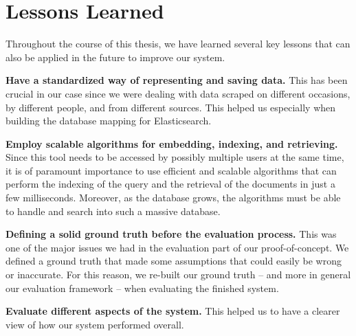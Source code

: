 \section{Lessons Learned}\label{sec:lessons-learned}
Throughout the course of this thesis, we have learned several key lessons that can also be applied in the future to improve our system.

\begin{description}
    \item \textbf{Have a standardized way of representing and saving data.} This has been crucial in our case since we were dealing with data scraped on different occasions, by different people, and from different sources.
    This helped us especially when building the database mapping for Elasticsearch.
    \item \textbf{Employ scalable algorithms for embedding, indexing, and retrieving.} Since this tool needs to be accessed by possibly multiple users at the same time, it is of paramount importance to use efficient and scalable algorithms that can perform the indexing of the query and the retrieval of the documents in just a few milliseconds.
    Moreover, as the database grows, the algorithms must be able to handle and search into such a massive database.
    \item \textbf{Defining a solid ground truth before the evaluation process.} This was one of the major issues we had in the evaluation part of our proof-of-concept.
    We defined a ground truth that made some assumptions that could easily be wrong or inaccurate.
    For this reason, we re-built our ground truth -- and more in general our evaluation framework -- when evaluating the finished system.
    \item \textbf{Evaluate different aspects of the system.} This helped us to have a clearer view of how our system performed overall.
\end{description}

